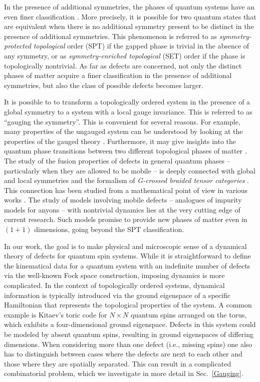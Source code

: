 In the presence of additional symmetries, the phases of quantum systems have an even finer classification \cite{Wen2002,SRFL08,Kitaev2009,FK10,CGW11,FK11,TPB11,LS12,LV12,FM13,EH13,NCMT14,WPS14,K14,F14,EN14,MFCV15,BRSX15,LV16}. More precisely, it is possible for two quantum states that are equivalent when there is no additional symmetry present to be distinct in the presence of additional symmetries. This phenomenon is referred to as \emph{symmetry-protected topological} order (SPT) \cite{CGLW13,Yoshida2015,Yoshida2017} if the gapped phase is trivial in the absence of any symmetry, or as \emph{symmetry-enriched topological} (SET) order \cite{ENO10,MR13,WBV17} if the phase is topologically nontrivial. As far as defects are concerned, not only the distinct phases of matter acquire a finer classification in the presence of additional symmetries, but also the class of possible defects becomes larger. 

It is possible to to transform a topologically ordered system in the presence of a global symmetry to a system with a local gauge invariance. This is referred to as ``gauging the symmetry''. This is convenient for several reasons. For example, many properties of the ungauged system can be understood by looking at the properties of the gauged theory \cite{LG12,HW12,Swingle2014,CG14}. Furthermore, it may give insights into the quantum phase transitions between two different topological phases of matter \cite{BS09,BW10,BW11,BSS12}. 
The study of the fusion properties of defects in general quantum phases -- particularly when they are allowed to be mobile -- is deeply connected with global and local symmetries and the formalism of \emph{G-crossed braided tensor categories} \cite{BBCW14}. This connection has been studied from a mathematical point of view in various works \cite{T00,ENO10,Turaev2010,CGPW16,EMJP18,CSZW18,D19,BJ19}. The study of models involving mobile defects -- analogues of impurity models for anyons -- with nontrivial dynamics lies at the very cutting edge of current research. Such models promise to provide new phases of matter even in $(1+1)$ dimensions, going beyond the SPT classification.

In our work, the goal is to make physical and microscopic sense of a dynamical theory of defects for quantum spin systems. While it is straightforward to define the kinematical data for a quantum system with an indefinite number of defects via the well-known Fock space construction, imposing dynamics is more complicated. In the context of topologically ordered systems, dynamical information is typically introduced via the ground eigenspace of a specific Hamiltonian that represents the topological properties of the system. A common example is Kitaev's toric code for $N\times N$ quantum spins arranged on the torus, which exhibits a four-dimensional ground eigenspace. Defects in this system could be modeled by absent quantum spins, resulting in ground eigenspaces of differing dimensions. When considering more than one defect (i.e., missing spins) one also has to distinguish between cases where the defects are next to each other and those where they are spatially separated. This can result in a  complicated combinatorial problem, which we investigate in more detail in Sec.~\ref{Gauging}.

